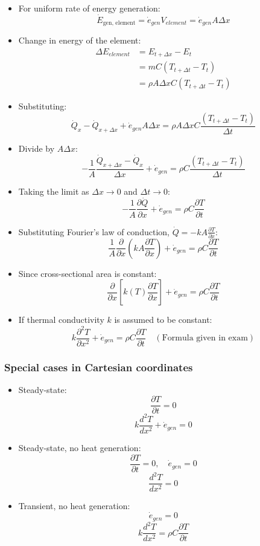\documentclass[11pt]{article}
\begin{document}
\begin{itemize}
\item For uniform rate of energy generation:
\[\dot{E}_{\text{gen, element}} = \dot{e}_{gen} V_{element} = \dot{e}_{gen} A \Delta x\]
\item Change in energy of the element:
\begin{align*}
\Delta E_{element} &= E_{t + \Delta x} - E_t \\
&= mC(T_{t + \Delta t} - T_t) \\
&= \rho A \Delta x C (T_{t + \Delta t} - T_t)
\end{align*}
\item Substituting:
\[\dot{Q}_x - \dot{Q}_{x + \Delta x} + \dot{e}_{gen} A \Delta x = \rho A \Delta x C \frac{(T_{t + \Delta t} - T_t)}{\Delta t}\]
\item Divide by \(A \Delta x\):
\[-\frac{1}{A} \frac{\dot{Q}_{x + \Delta x} - \dot{Q}_x}{\Delta x} + \dot{e}_{gen} = \rho C \frac{(T_{t + \Delta t} - T_t)}{\Delta t}\]
\item Taking the limit as \(\Delta x \rightarrow 0\) and \(\Delta t \rightarrow 0\):
\[-\frac{1}{A} \frac{\partial \dot{Q}}{\partial x} + \dot{e}_{gen} = \rho C \frac{\partial T}{\partial t}\]
\item Substituting Fourier's law of conduction, \(\dot{Q} = -kA \frac{\partial T}{\partial x}\):
\[\frac{1}{A} \frac{\partial}{\partial x} \left(kA \frac{\partial T}{\partial x} \right) + \dot{e}_{gen} = \rho C \frac{\partial T}{\partial t}\]
\item Since cross-sectional area is constant:
\[\frac{\partial}{\partial x} \left[k(T) \frac{\partial T}{\partial x} \right] + \dot{e}_{gen} = \rho C \frac{\partial T}{\partial t}\]
\item If thermal conductivity \(k\) is assumed to be constant:
\[k \frac{\partial^2 T}{\partial x^2} + \dot{e}_{gen} = \rho C \frac{\partial T}{\partial t} \quad (\text{Formula given in exam})\]
\end{itemize}

\subsubsection{Special cases in Cartesian coordinates}
\label{sec:orgadfa13b}
\begin{itemize}
\item Steady-state:
\[\frac{\partial T}{\partial t} = 0\]
\[k \frac{d^2 T}{dx^2} + \dot{e}_{gen} = 0\]
\item Steady-state, no heat generation:
\[\frac{\partial T}{\partial t} = 0, \quad \dot{e}_{gen} = 0\]
\[\frac{d^2 T}{dx^2} = 0\]
\item Transient, no heat generation:
\[\dot{e}_{gen} = 0\]
\[k \frac{d^2 T}{dx^2} = \rho C \frac{\partial T}{\partial t}\]
\end{itemize}
\end{document}
